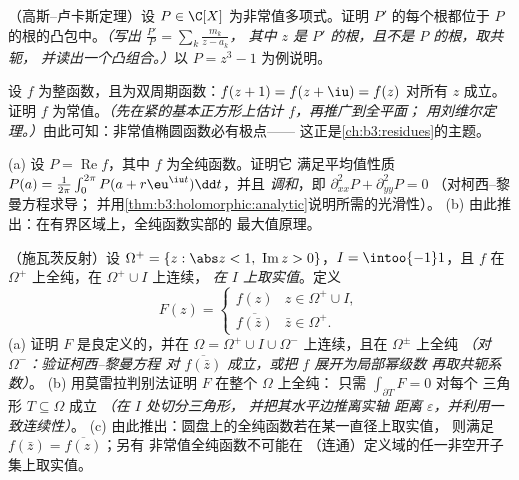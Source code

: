 \begin{exercise}[$\star\star\star$]\label{exo:b3:holomorphic:8}
（高斯–卢卡斯定理）设 $P \in \C[X]$ 为非常值多项式。证明
$P'$ 的每个根都位于
$P$ 的根的凸包中。\emph{（写出 $\frac{P'}{P} = \sum_k\frac{m_k}{z - a_k}$，
其中 $z$ 是 $P'$ 的根，且不是 $P$ 的根，取共轭，
并读出一个凸组合。）}以
$P = z^3 - 1$ 为例说明。
\end{exercise}

\begin{exercise}[$\star\star\star$]\label{exo:b3:holomorphic:9}
设 $f$ 为整函数，且为双周期函数：$f(z + 1) = f(z + \iu)
= f(z)$ 对所有 $z$ 成立。证明 $f$ 为常值。\emph{（先在紧的基本正方形上估计
$f$，再推广到全平面；
用刘维尔定理。）}由此可知：非常值椭圆函数必有极点——
这正是\cref{ch:b3:residues}的主题。
\end{exercise}

\begin{exercise}[$\star\star$]\label{exo:b3:holomorphic:10}
(a) 设 $P = \operatorname{Re}f$，其中 $f$ 为全纯函数。证明它
满足平均值性质 $P(a) =
\frac1{2\pi}\int_0^{2\pi}P(a + r\eu^{\iu t})\dd t$，并且
\emph{调和}，即 $\partial^2_{xx}P + \partial^2_{yy}P = 0$
（对柯西–黎曼方程求导；
并用\cref{thm:b3:holomorphic:analytic}说明所需的光滑性）。
(b) 由此推出：在有界区域上，全纯函数实部的
最大值原理。
\end{exercise}

\begin{exercise}[$\star\star\star$]\label{exo:b3:holomorphic:11}
（施瓦茨反射）设 $\Omega^+ = \{z : \abs z < 1,\
\operatorname{Im}z > 0\}$，$I = \intoo{-1}1$，且 $f$
在 $\Omega^+$ 上全纯，在 $\Omega^+\cup I$ 上连续，
\emph{在 $I$ 上取实值}。定义
\[
F(z) = \begin{cases} f(z) & z \in \Omega^+\cup I,\\
\overline{f(\bar z)} & \bar z \in \Omega^+ . \end{cases}
\]
(a) 证明 $F$ 是良定义的，并在
$\Omega = \Omega^+\cup I\cup\Omega^-$ 上连续，且在
$\Omega^\pm$ 上全纯 \emph{（对 $\Omega^-$：验证柯西–黎曼方程
对 $\overline{f(\bar z)}$ 成立，或把 $f$ 展开为局部幂级数
再取共轭系数）}。
(b) 用莫雷拉判别法证明 $F$ 在整个 $\Omega$ 上全纯：
只需 $\int_{\partial T}F = 0$ 对每个
三角形 $T \subseteq \Omega$ 成立 \emph{（在 $I$ 处切分三角形，
并把其水平边推离实轴
距离 $\varepsilon$，并利用一致连续性）}。
(c) 由此推出：圆盘上的全纯函数若在某一直径上取实值，
则满足 $f(\bar z) = \overline{f(z)}$；另有
非常值全纯函数不可能在
（连通）定义域的任一非空开子集上取实值。
\end{exercise}

